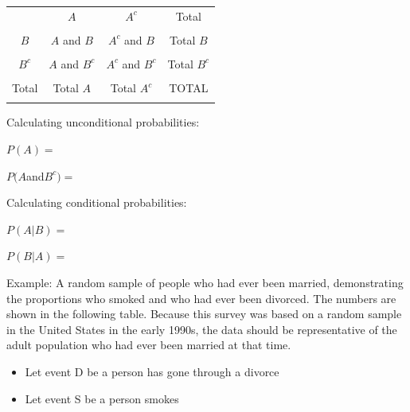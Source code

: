 \documentclass[
]{report}
\begin{document}
\begin{center}
\begin{tabular}{|c|c|c|c|} \hline
\hspace{0.8in} & \hspace{0.35in} $A$ \hspace{.35in} & \hspace{0.35in} $A^c$  \hspace{0.35in} & \hspace{0.3in} Total \hspace{0.3in} \\ 
& & & \\ \hline
$B$& $A$ and $B$ & $A^c$ and $B$ & Total $B$ \\ 
& & & \\ \hline
$B^c$& $A$ and $B^c$ & $A^c$ and $B^c$ & Total $B^c$ \\ 
& & & \\ \hline
Total & Total $A$ & Total $A^c$ & TOTAL \\ 
& & & \\ \hline
\end{tabular}
\end{center}
\vspace{.1in}


Calculating unconditional probabilities:

\(P(A)=\)

\vspace{0.2in}

\(P(A\)and\(B^c) =\)

\vspace{0.2in}

Calculating conditional probabilities:

\(P(A|B)=\)

\vspace{0.2in}

\(P(B|A) =\)

\vspace{0.2in}


Example: A random sample of people who had ever been married, demonstrating the proportions who smoked and who had ever been divorced. The numbers are shown in the following table. Because this survey was based on a random sample in the United States in the early 1990s, the data should be representative of the adult population who had ever been married at that time.

\begin{itemize}
\item
  Let event D be a person has gone through a divorce
\item
  Let event S be a person smokes
\end{itemize}
\end{document}
